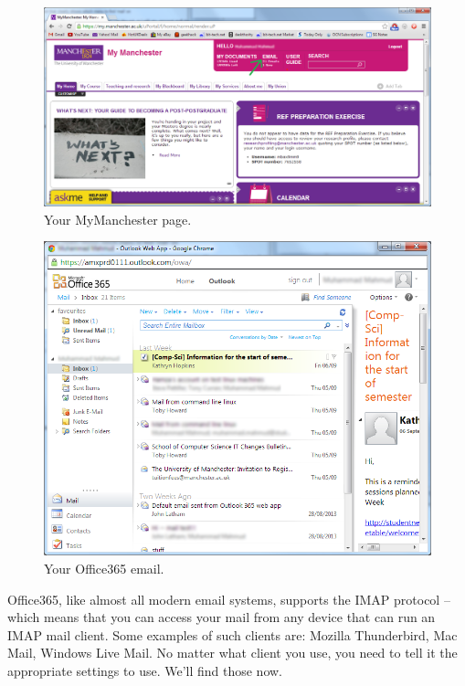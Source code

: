 \begin{figure}
\centerline{\includegraphics[width=15cm]{images/hamza-email-link.png}}
\caption{Your MyManchester page.}
\label{figure:welc-mymanchester}
\end{figure}

\begin{figure}
\centerline{\includegraphics[width=15cm]{images/hamza-365-mail.png}}
\caption{Your Office365 email.}
\label{figure:welc-mail365}
\end{figure}

\label{sec:reading-your-mail}

Office365, like almost all modern email systems, supports the IMAP
protocol -- which means that you can access your mail from any device
that can run an IMAP mail client. Some examples of such clients are:
Mozilla Thunderbird, Mac Mail, Windows Live Mail. No matter what
client you use, you need to tell it the appropriate settings to
use. We'll find those now.

